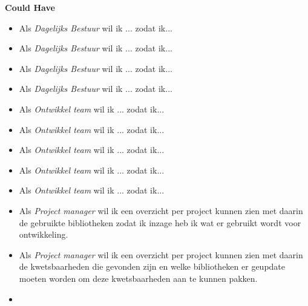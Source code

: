 \textbf{Could Have}
\begin{itemize}
  \item Als \textit{Dagelijks Bestuur} wil ik  ... zodat ik...
  \item Als \textit{Dagelijks Bestuur} wil ik  ... zodat ik...
  \item Als \textit{Dagelijks Bestuur} wil ik  ... zodat ik...
  \item Als \textit{Dagelijks Bestuur} wil ik  ... zodat ik...
  \item Als \textit{Ontwikkel team } wil ik  ... zodat ik...
  \item Als \textit{Ontwikkel team } wil ik  ... zodat ik...
  \item Als \textit{Ontwikkel team } wil ik  ... zodat ik...
  \item Als \textit{Ontwikkel team } wil ik  ... zodat ik...
  \item Als \textit{Ontwikkel team } wil ik  ... zodat ik...
  \item Als \textit{Project manager} wil ik een overzicht per project kunnen zien met daarin de gebruikte bibliotheken zodat ik inzage heb ik wat er gebruikt wordt voor ontwikkeling.
  \item Als \textit{Project manager} wil ik een overzicht per project kunnen zien met daarin de kwetsbaarheden die gevonden zijn en welke bibliotheken er geupdate moeten worden om deze kwetsbaarheden aan te kunnen pakken.\item
\end{itemize}

